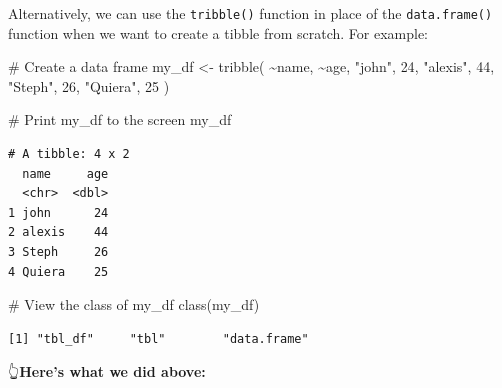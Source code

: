 \documentclass[
  letterpaper,
  DIV=11,
  numbers=noendperiod]{scrreprt}
\newenvironment{Shaded}{\begin{snugshade}}{\end{snugshade}}
\newcommand{\CommentTok}[1]{\textcolor[rgb]{0.37,0.37,0.37}{#1}}
\newcommand{\DecValTok}[1]{\textcolor[rgb]{0.68,0.00,0.00}{#1}}
\newcommand{\FunctionTok}[1]{\textcolor[rgb]{0.28,0.35,0.67}{#1}}
\newcommand{\NormalTok}[1]{\textcolor[rgb]{0.00,0.23,0.31}{#1}}
\newcommand{\OtherTok}[1]{\textcolor[rgb]{0.00,0.23,0.31}{#1}}
\newcommand{\SpecialCharTok}[1]{\textcolor[rgb]{0.37,0.37,0.37}{#1}}
\newcommand{\StringTok}[1]{\textcolor[rgb]{0.13,0.47,0.30}{#1}}
\begin{document}
Alternatively, we can use the \texttt{tribble()} function in place of
the \texttt{data.frame()} function when we want to create a tibble from
scratch. For example:

\begin{Shaded}
\begin{Highlighting}[]
\CommentTok{\# Create a data frame}
\NormalTok{my\_df }\OtherTok{\textless{}{-}} \FunctionTok{tribble}\NormalTok{(}
  \SpecialCharTok{\textasciitilde{}}\NormalTok{name,    }\SpecialCharTok{\textasciitilde{}}\NormalTok{age,}
  \StringTok{"john"}\NormalTok{,   }\DecValTok{24}\NormalTok{, }
  \StringTok{"alexis"}\NormalTok{, }\DecValTok{44}\NormalTok{, }
  \StringTok{"Steph"}\NormalTok{,  }\DecValTok{26}\NormalTok{,}
  \StringTok{"Quiera"}\NormalTok{, }\DecValTok{25}
\NormalTok{)}

\CommentTok{\# Print my\_df to the screen}
\NormalTok{my\_df}
\end{Highlighting}
\end{Shaded}

\begin{verbatim}
# A tibble: 4 x 2
  name     age
  <chr>  <dbl>
1 john      24
2 alexis    44
3 Steph     26
4 Quiera    25
\end{verbatim}

\begin{Shaded}
\begin{Highlighting}[]
\CommentTok{\# View the class of my\_df}
\FunctionTok{class}\NormalTok{(my\_df)}
\end{Highlighting}
\end{Shaded}

\begin{verbatim}
[1] "tbl_df"     "tbl"        "data.frame"
\end{verbatim}

👆\textbf{Here's what we did above:}
\end{document}
